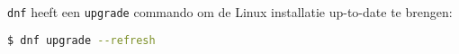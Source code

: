 \texttt{dnf} heeft een \texttt{upgrade} commando om de Linux installatie up-to-date te brengen:
\begin{lstlisting}[language=bash]
$ dnf upgrade --refresh
\end{lstlisting}

